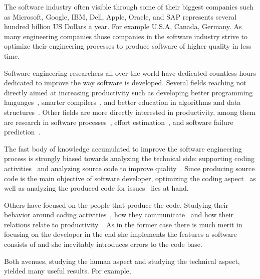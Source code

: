 The software industry often visible through some of their biggest companies such as Microsoft, Google, IBM, Dell, Apple, Oracle, and SAP represents several hundred billion US Dollars a year. 
For example  U.S.A, Canada, Germany.
As many engineering companies those companies in the software industry strive to optimize their engineering processes to produce software of higher quality in less time.

Software engineering researchers all over the world have dedicated countless hours dedicated to improve the way software is developed.
Several fields reaching not directly aimed at increasing productivity such as developing better programming languages~\cite{}, smarter compilers~\cite{}, and better education in algorithms and data structures~\cite{}.
Other fields are more directly interested in productivity, among them are research in software processes~\cite{}, effort estimation~\cite{}, and software failure prediction~\cite{}.

The fast body of knowledge accumulated to improve the software engineering process is strongly biased towards analyzing the technical side: supporting coding activities~\cite{} and analyzing source code to improve quality~\cite{}. 
Since producing source code is the main objective of software developer, optimizing the coding aspect~\cite{} as well as analyzing the produced code for issues~\cite{} lies at hand.

Others have focused on the people that produce the code. Studying their behavior around coding activities~\cite{}, how they communicate~\cite{} and how their relations relate to productivity~\cite{}.
As in the former case there is much merit in focusing on the developer in the end she implements the features a software consists of and she inevitably introduces errors to the code base.

Both avenues, studying the human aspect and studying the technical aspect, yielded many useful results.
For example,  
